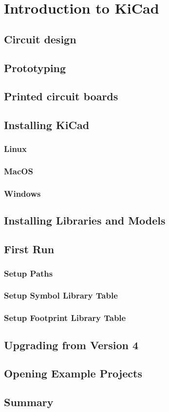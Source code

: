 
\chapter{Introduction to KiCad}
\label{ch:intro-kicad}

\section{Circuit design}


\section{Prototyping}

\section{Printed circuit boards}

\section{Installing KiCad}
\subsection{Linux}
\subsection{MacOS}
\subsection{Windows}

\section{Installing Libraries and Models}

\section{First Run}
\subsection{Setup Paths}
\subsection{Setup Symbol Library Table}
\subsection{Setup Footprint Library Table}

\section{Upgrading from Version 4}

\section{Opening Example Projects}

\section{Summary}